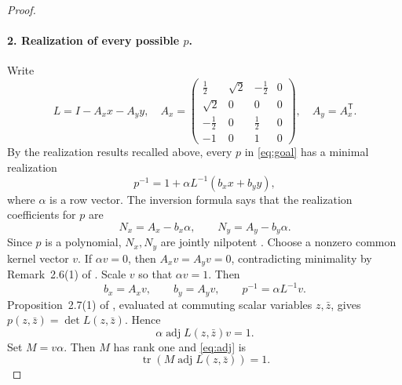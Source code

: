 \documentclass[11pt]{article}
\newcommand{\adj}{\operatorname{adj}}
\newcommand{\tr}{\operatorname{tr}}
\begin{document}
\begin{proof}
\paragraph{2. Realization of every possible $p$.}
Write
\[
L=I-A_xx-A_yy,
\quad
A_x=\begin{pmatrix}
\frac12&\sqrt2&-\frac12&0\\
\sqrt2&0&0&0\\
-\frac12&0&\frac12&0\\
-1&0&1&0
\end{pmatrix},
\quad A_y=A_x^{\mathsf T}.
\]
By the realization results recalled above, every $p$ in \eqref{eq:goal} has a minimal realization
\[
p^{-1}=1+\alpha L^{-1}(b_xx+b_yy),
\]
where $\alpha$ is a row vector.  The inversion formula says that the realization coefficients for $p$ are
\[
N_x=A_x-b_x\alpha,
\qquad
N_y=A_y-b_y\alpha.
\]
Since $p$ is a polynomial, $N_x,N_y$ are jointly nilpotent \cite[Remark~2.6(5)--(6)]{HKMV}.  Choose a nonzero common kernel vector $v$.  If $\alpha v=0$, then $A_xv=A_yv=0$, contradicting minimality by Remark~2.6(1) of \cite{HKMV}.  Scale $v$ so that $\alpha v=1$.  Then
\[
b_x=A_xv,\qquad b_y=A_yv,\qquad
p^{-1}=\alpha L^{-1}v.
\]
Proposition~2.7(1) of \cite{HKMV}, evaluated at commuting scalar variables $z,\bar z$, gives $p(z,\bar z)=\det L(z,\bar z)$.  Hence
\begin{equation}\label{eq:adj}
\alpha\adj L(z,\bar z)v=1.
\end{equation}
Set $M=v\alpha$.  Then $M$ has rank one and \eqref{eq:adj} is
\begin{equation}\label{eq:trace}
\tr\!\left(M\adj L(z,\bar z)\right)=1.
\end{equation}


\end{proof}
\end{document}
